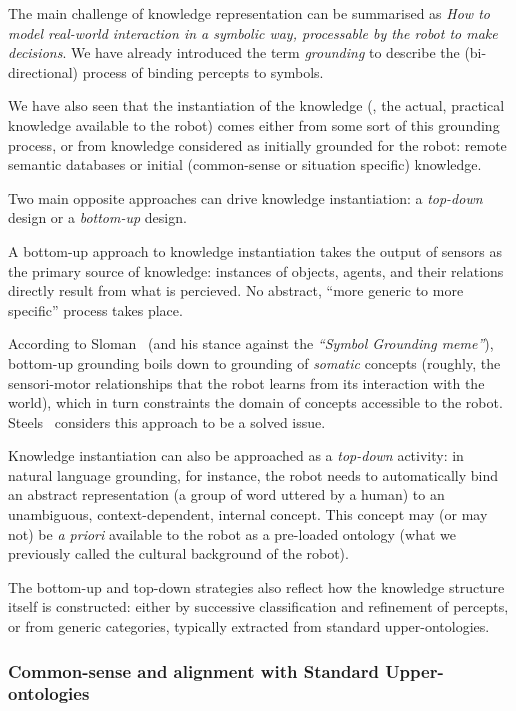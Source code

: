 The main challenge of knowledge representation can be summarised as \emph{How to
model real-world interaction in a symbolic way, processable by the robot to
make decisions}. We have already introduced the term \emph{grounding} to
describe the (bi-directional) process of binding percepts to symbols.

We have also seen that the instantiation of the knowledge (\ie, the actual,
practical knowledge available to the robot) comes either from some sort of this
grounding process, or from knowledge considered as initially grounded for the
robot: remote semantic databases or initial (common-sense or situation
specific) knowledge.

Two main opposite approaches can drive knowledge instantiation: a
\emph{top-down} design or a \emph{bottom-up} design.

A bottom-up approach to knowledge instantiation takes the output of sensors as
the primary source of knowledge: instances of objects, agents, and their
relations directly result from what is percieved. No abstract, ``more generic
to more specific'' process takes place.

According to Sloman~\cite{Sloman2007} (and his stance against the
\emph{``Symbol Grounding meme''}), bottom-up grounding boils down to grounding
of \emph{somatic} concepts (\ie roughly, the sensori-motor relationships that
the robot learns from its interaction with the world), which in turn
constraints the domain of concepts accessible to the robot.
Steels~\cite{Steels2007} considers this approach to be a solved issue.

Knowledge instantiation can also be approached as a \emph{top-down} activity:
in natural language grounding, for instance, the robot needs to automatically
bind an abstract representation (a group of word uttered by a human) to an
unambiguous, context-dependent, internal concept. This concept may (or may not)
be \textit{a priori} available to the robot as a pre-loaded ontology (what we
previously called the cultural background of the robot).

The bottom-up and top-down strategies also reflect how the knowledge structure
itself is constructed: either by successive classification and refinement of
percepts, or from generic categories, typically extracted from standard
upper-ontologies.

\subsubsection{Common-sense and alignment with Standard Upper-ontologies}

